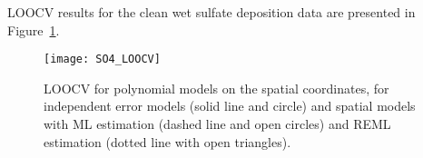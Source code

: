 \documentclass[12pt, titlepage]{article}
\begin{document}
LOOCV results for the clean wet sulfate deposition data are presented in Figure~\ref{Fig:SO4_LOOCV}.
\begin{figure}[h]
  \begin{center}
	    \texttt{[image: SO4\_LOOCV]}
  \end{center}
  \caption{LOOCV for polynomial models on the spatial coordinates, for independent error models (solid line and circle) and spatial models with ML estimation (dashed line and open circles) and REML estimation (dotted line with open triangles). \label{Fig:SO4_LOOCV}}
\end{figure}


%


%
%
\end{document}
